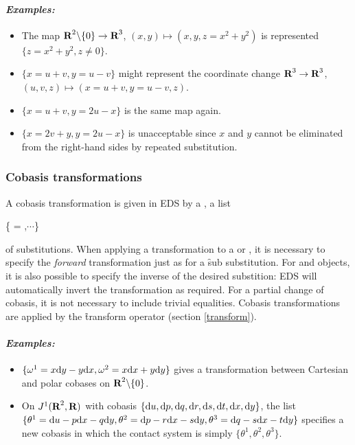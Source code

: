 \paragraph{\it Examples:}
\begin{itemize}
\item The map $\hbox{\bf R}^2\backslash\{0\}\to\hbox{\bf R}^3$, $(x,y)\mapsto (x,y,z=x^2+y^2)$
      is represented $\{z = x^2+y^2,z\neq 0\}$.
\item $\{x=u+v,y=u-v\}$ might represent the coordinate change
      $\hbox{\bf R}^3\to\hbox{\bf R}^3$, $(u,v,z)\mapsto(x=u+v,y=u-v,z)$.
\item $\{x=u+v,y=2u-x\}$ is the same map again.
\item $\{x=2v+y,y=2u-x\}$ is unacceptable since $x$ and $y$ cannot be
      eliminated from the right-hand sides by repeated substitution.
\end{itemize}

\subsubsection{Cobasis transformations}
\label{Cobasis transformations}

A cobasis transformation is given in EDS by a , a list
\begin{edssyntax}
	\{ = ,$\cdots$\}
\end{edssyntax}
of substitutions. When applying a transformation to a  or
, it is necessary to specify the {\it forward}
transformation just as for a \f{sub} substitution. For  and
 objects, it is also possible to specify the inverse of
the desired substition: EDS will automatically invert the transformation
as required. For a partial change of cobasis, it is not necessary to
include trivial equalities. Cobasis transformations are applied by the
\f{transform} operator (section \ref{transform}). 

\paragraph{\it Examples:}
\begin{itemize}
\item $\{\omega^1 = x\mathrm{d} y - y\mathrm{d} x, \omega^2 = x\mathrm{d} x + y\mathrm{d} y\}$ gives a
transformation between Cartesian and polar cobases on
$\hbox{\bf R}^2\backslash\{0\}$.
\item On $J^1(\hbox{\bf R}^2,\hbox{\bf R})$ with cobasis $\{\mathrm{d} u,\mathrm{d} p,\mathrm{d} q,\mathrm{d} r,\mathrm{d} s,\mathrm{d} t,\mathrm{d}
x,\mathrm{d} y\}$, the list $\{\theta^1=\mathrm{d} u - p\mathrm{d} x - q\mathrm{d} y, \theta^2=\mathrm{d} p -
r\mathrm{d} x - s\mathrm{d} y, \theta^3=\mathrm{d} q - s\mathrm{d} x - t\mathrm{d} y\}$ specifies a new cobasis in
which the contact system is simply $\{\theta^1,\theta^2,\theta^3\}$.
\end{itemize}

